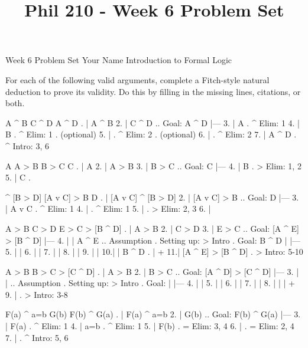 
\title{Phil 210 - Week 6 Problem Set}

\heading
Week 6 Problem Set
Your Name
Introduction to Formal Logic
\endheading

For each of the following valid arguments, complete a Fitch-style natural deduction to prove its validity. Do this by filling in the missing lines, citations, or both.

\problems
{}
\argument
 A ^ B
 C ^ D
\argumentline
 A ^ D
\endargument
	\answer
	. | A ^ B
	 2. | C ^ D  ..  Goal: A ^ D
	    |---
	 3. | A      .  ^ Elim: 1
	 4. | B      .  ^ Elim: 1  .  (optional)
	 5. |        .  ^ Elim: 2  .  (optional)
	 6. |        .  ^ Elim: 2
	 7. | A ^ D  .  ^ Intro: 3, 6
	\endfitchproof
	\endanswer

\argument
 A
 A > B
 B > C
\argumentline
 C
\endargument
	\answer
	. | A
	 2. | A > B
	 3. | B > C  ..  Goal: C
	    |---
	 4. | B      .  > Elim: 1, 2
	 5. | C      .  
	\endfitchproof
	\endanswer

\argument
 [A v C] ^ [B > D]
 [A v C] > B
\argumentline
 D
\endargument
	\answer
	. | [A v C] ^ [B > D]
	 2. | [A v C] > B        ..  Goal: D
	    |---
	 3. | A v C              .  ^ Elim: 1
	 4. |                    .  ^ Elim: 1
	 5. |                    .  > Elim: 2, 3
	 6. | 
	\endfitchproof
	\endanswer

\argument
 A > B
 C > D
 E > C
\argumentline
 [A ^ E] > [B ^ D]
\endargument
	\answer
	. | A > B
	 2. | C > D
	 3. | E > C      ..  Goal: [A ^ E] > [B ^ D]
	    |---
	 4. |   | A ^ E  ..  Assumption  .  Setting up: > Intro  .  Goal: B ^ D
	    |   |---
	 5. |   | 
	 6. |   | 
	 7. |   | 
	 8. |   | 
	 9. |   | 
	 10.|   | B ^ D   .  
	    |   +
	 11.| [A ^ E] > [B ^ D]  .  > Intro: 5-10
	\endfitchproof
	\endanswer

\argument
 A > B
 B > C
\argumentline
 [A ^ D] > [C ^ D]
\endargument
	\answer
	. | A > B
	 2. | B > C      ..  Goal: [A ^ D] > [C ^ D]
	    |---
	 3. |   |        ..  Assumption  .  Setting up: > Intro  .  Goal: 
	    |   |---
	 4. |   | 
	 5. |   | 
	 6. |   | 
	 7. |   | 
	 8. |   | 
	    |   +
	 9. |            .  > Intro: 3-8
	\endfitchproof
	\endanswer

\argument
 F(a) ^ a=b
 G(b)
\argumentline
 F(b) ^ G(a)
\endargument
	\answer
	. | F(a) ^ a=b
	 2. | G(b)         ..  Goal: F(b) ^ G(a)
	    |---
	 3. | F(a)         .  ^ Elim: 1
	 4. | a=b          .  ^ Elim: 1
	 5. | F(b)         .  = Elim: 3, 4
	 6. |              .  = Elim: 2, 4
	 7. |              .  ^ Intro: 5, 6
	\endfitchproof
	\endanswer

